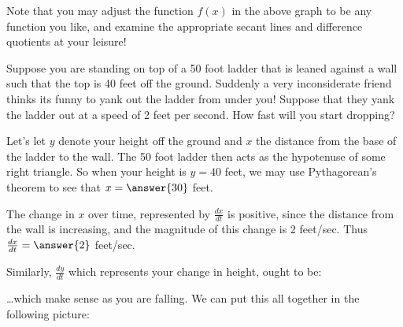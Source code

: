 \documentclass{ximera}
\begin{document}
\begin{question}
\begin{enumerate}
\end{enumerate}

Note that you may adjust the function $f(x)$ in the above graph to be any function you like, and examine the appropriate secant lines and difference quotients at your leisure!


\end{question}


\begin{question}

Suppose you are standing on top of a 50 foot ladder that is leaned against a wall such that the top is 40 feet off the ground.  Suddenly a very inconsiderate friend thinks its funny to yank out the ladder from under you!  Suppose that they yank the ladder out at a speed of 2 feet per second.  How fast will you start dropping?

\begin{explanation}

Let's let $y$ denote your height off the ground and $x$ the distance from the base of the ladder to the wall.  The 50 foot ladder then acts as the hypotenuse of some right triangle.  So when your height is $y=40$ feet, we may use Pythagorean's theorem to see that $x=\answer{30}$ feet.

The change in $x$ over time, represented by $\frac{dx}{dt}$ is positive, since the distance from the wall is increasing, and the magnitude of this change is 2 feet/sec.  Thus $\frac{dx}{dt}=\answer{2}$ feet/sec.

Similarly, $\frac{dy}{dt}$ which represents your change in height, ought to be:

\begin{multipleChoice}
\end{multipleChoice}

\ldots which make sense as you are falling.  We can put this all together in the following picture:

\begin{image}
\end{image}
\end{explanation}
\end{question}
\end{document}

